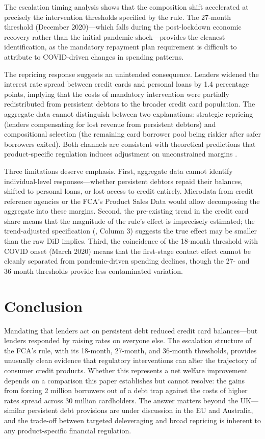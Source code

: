 \documentclass[12pt]{article}
\begin{document}
The escalation timing analysis shows that the composition shift accelerated at precisely the intervention thresholds specified by the rule. The 27-month threshold (December 2020)---which falls during the post-lockdown economic recovery rather than the initial pandemic shock---provides the cleanest identification, as the mandatory repayment plan requirement is difficult to attribute to COVID-driven changes in spending patterns.

The repricing response suggests an unintended consequence. Lenders widened the interest rate spread between credit cards and personal loans by 1.4 percentage points, implying that the costs of mandatory intervention were partially redistributed from persistent debtors to the broader credit card population. The aggregate data cannot distinguish between two explanations: strategic repricing (lenders compensating for lost revenue from persistent debtors) and compositional selection (the remaining card borrower pool being riskier after safer borrowers exited). Both channels are consistent with theoretical predictions that product-specific regulation induces adjustment on unconstrained margins \citep{agarwal2015, nelson2022}.

Three limitations deserve emphasis. First, aggregate data cannot identify individual-level responses---whether persistent debtors repaid their balances, shifted to personal loans, or lost access to credit entirely. Microdata from credit reference agencies or the FCA's Product Sales Data would allow decomposing the aggregate into these margins. Second, the pre-existing trend in the credit card share means that the magnitude of the rule's effect is imprecisely estimated; the trend-adjusted specification (, Column 3) suggests the true effect may be smaller than the raw DiD implies. Third, the coincidence of the 18-month threshold with COVID onset (March 2020) means that the first-stage contact effect cannot be cleanly separated from pandemic-driven spending declines, though the 27- and 36-month thresholds provide less contaminated variation.

\section{Conclusion}

Mandating that lenders act on persistent debt reduced credit card balances---but lenders responded by raising rates on everyone else. The escalation structure of the FCA's rule, with its 18-month, 27-month, and 36-month thresholds, provides unusually clean evidence that regulatory interventions can alter the trajectory of consumer credit products. Whether this represents a net welfare improvement depends on a comparison this paper establishes but cannot resolve: the gains from forcing 2 million borrowers out of a debt trap against the costs of higher rates spread across 30 million cardholders. The answer matters beyond the UK---similar persistent debt provisions are under discussion in the EU and Australia, and the trade-off between targeted deleveraging and broad repricing is inherent to any product-specific financial regulation.
\end{document}

